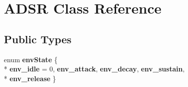 \hypertarget{class_a_d_s_r}{}\section{A\+D\+SR Class Reference}
\label{class_a_d_s_r}
\subsection*{Public Types}
\begin{DoxyCompactItemize}
\item 
enum {\bfseries env\+State} \{ \\*
{\bfseries env\+\_\+idle} = 0, 
{\bfseries env\+\_\+attack}, 
{\bfseries env\+\_\+decay}, 
{\bfseries env\+\_\+sustain}, 
\\*
{\bfseries env\+\_\+release}
 \}\hypertarget{class_a_d_s_r_a30e1fed82afed75d2e0fd991ba49f817}{}\label{class_a_d_s_r_a30e1fed82afed75d2e0fd991ba49f817}

\end{DoxyCompactItemize}
